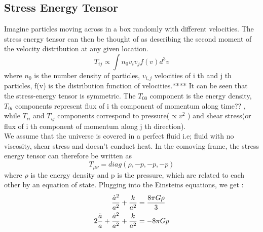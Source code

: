 \documentclass[12pt,a4paper,oneside]{book}
\begin{document}
\subsection{Stress Energy Tensor}
Imagine particles moving across in a box randomly with different velocities. The stress energy tensor can then be thought of as describing the second moment of the velocity distribution at any given location.  
\begin{equation}
     T_{ij} \propto \int n_{0}v_{i}v_{j}f(v)d^3v
\end{equation}
where $n_{0}$ is the number density of particles, $v_{i,j}$ velocities of i th and j th particles, f(v) is the distribution function of velocities.**** It can be seen that the stress-energy tensor is symmetric. The $T_{00}$ component is the energy density, $T_{0i}$ components represent flux of i th component of momentum along time?? , while $T_{ii}$ and $T_{ij}$ components correspond to pressure($\propto v^2$ ) and shear stress(or flux of i th component of momentum along j th direction).\\
We assume that the universe is covered in a perfect fluid i.e; fluid with no viscosity, shear stress and doesn't conduct heat. In the comoving frame, the stress energy tensor can therefore be written as 
\begin{equation}
    T_{\mu\nu} = diag(\rho,-p,-p,-p)
\end{equation}
where $\rho$ is the energy density and p is the pressure, which are related to each other by an equation of state.
Plugging into the Einsteins equations, we get :
\begin{align}
    \frac{\dot a^2}{a^2} + \frac{k}{a^2} &= \frac{8\pi G \rho}{3} \\
    2 \frac{\Ddot{a}}{a} + \frac{\dot a^2}{a^2} + \frac{k}{a^2} &= -8 \pi G p
\end{align}
\end{document}
